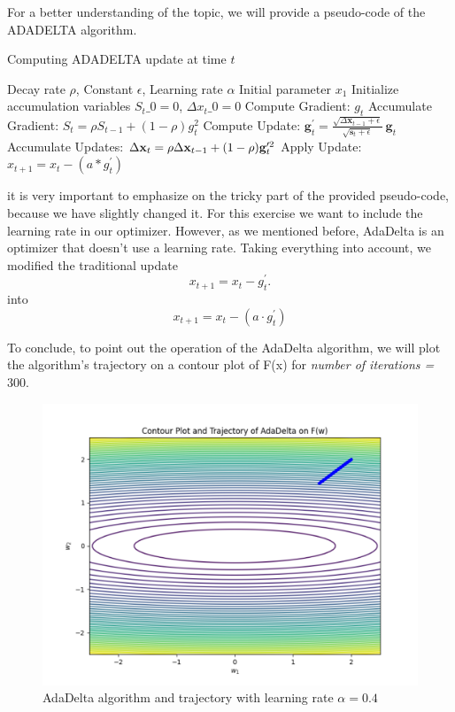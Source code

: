 For a better understanding of the topic, we will provide a pseudo-code of the ADADELTA algorithm.
	\begin{algorithm}[H]
		\caption{Computing ADADELTA update at time $t$}
		\begin{algorithmic}
			\Require Decay rate $\rho$, Constant $\epsilon$, Learning rate $\alpha$
			\Require Initial parameter $x_1$
			\State Initialize accumulation variables $S_t\_0 = 0$, $\Delta x_t\_0 = 0$
			\State Compute Gradient: $g_t$
			\State Accumulate Gradient: $S_t = \rho S_{t-1} + (1 - \rho)g_t^2$
			\State Compute Update: $	\mathbf{g}_{t}^{\prime}={\frac{\sqrt{\Delta\mathbf{x}_{t-1}+\epsilon}}{\sqrt{\mathbf{s}_{t}+\epsilon}}}~\mathbf{g}_{t}$
			\State Accumulate Updates: 	$\Delta{\bf x}_{t}=\rho\Delta{\bf x}_{t-1}+(1-\rho){\bf g}_{t}^{\prime2}$
			\State Apply Update: $x_{t+1} = x_t - (a*g_{t}^{\prime})$
			\EndFor
		\end{algorithmic}
	\end{algorithm}
it is very important to emphasize on the tricky part of the provided pseudo-code, because we have slightly changed it. For this exercise we want to include the learning rate in our optimizer. However, as we mentioned before, AdaDelta is an optimizer that doesn't use a learning rate. Taking everything into account, we modified the traditional update
\begin{equation}
	{x}_{t+1}={x}_{t}-{g}_{t}^{\prime}.
\end{equation}
into
\begin{equation}
	x_{t+1} = x_t - (a \cdot g_{t}^{\prime})
\end{equation}

To conclude, to point out the operation of the AdaDelta algorithm, we will plot the algorithm’s trajectory on a contour plot of F(x) for \textit{number of iterations = $300$}.
\begin{figure}[H]
	\centering
	\includegraphics[width=.7\textwidth]{../Problem 8/ADADELTA_04.pdf}
	\caption{AdaDelta algorithm and trajectory with learning rate $\alpha=0.4$}
	\label{fig:lr=0.4}
\end{figure}
\vspace{2mm}

